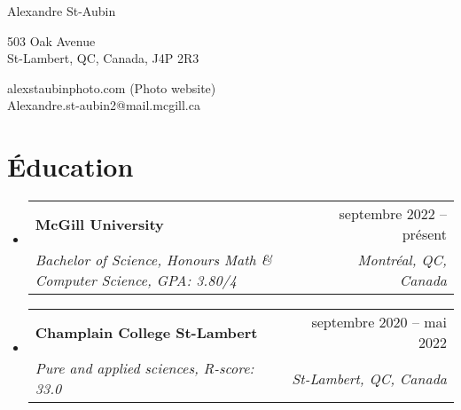 \documentclass[letterpaper,11pt]{article}
\makeatletter
\newcommand{\resumeSubheading}[4]{
  \vspace{-2pt}\item
    \begin{tabular*}{0.97\textwidth}[t]{l@{\extracolsep{\fill}}r}
      \textbf{#1} & #2 \\
      \textit{\small #3} & \textit{\small #4} \\
    \end{tabular*}\vspace{-10pt}
}
\newcommand{\resumeSubHeadingListStart}{\begin{itemize}[leftmargin=0.15in, label={}]}
\newcommand{\resumeSubHeadingListEnd}{\end{itemize}}
\makeatother
\begin{document}
\begin{center}
    {\LARGE Alexandre St-Aubin} \\ \vspace{0pt}
    \begin{multicols}{2}
    \begin{flushleft}
    \large{503 Oak Avenue} \\
    \large{St-Lambert, QC, Canada, J4P 2R3} \\
    \end{flushleft}
    
    \begin{flushright}
    \href{alexstaubinphoto.com} \large{alexstaubinphoto.com (Photo website)} \\
    \href{mailto:{your email adress}} \large{Alexandre.st-aubin2@mail.mcgill.ca}
    \end{flushright}
    \end{multicols}
\end{center}


\section{Éducation}
\resumeSubHeadingListStart

    \resumeSubheading
        {McGill University}{septembre 2022 -- présent}
        {Bachelor of Science, Honours Math \& Computer Science, GPA: 3.80/4}{Montréal, QC, Canada}
      \resumeSubheading
        {Champlain College St-Lambert  }{septembre 2020 -- mai 2022}
        {Pure and applied sciences, R-score: 33.0}{St-Lambert, QC, Canada}

\resumeSubHeadingListEnd


\end{document}
